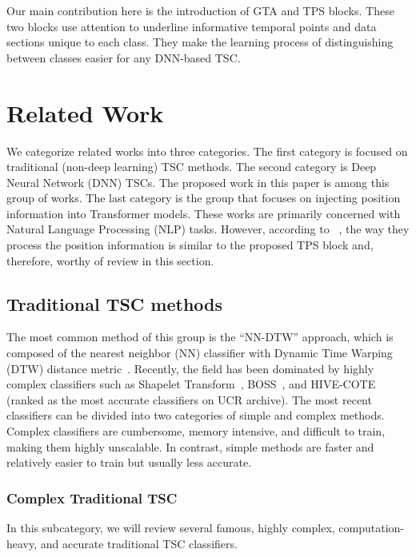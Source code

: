 \documentclass[journal]{IEEEtran}
\begin{document}
Our main contribution here is the introduction of GTA and TPS blocks. These two blocks use attention to underline informative temporal points and data sections unique to each class. They make the learning process of distinguishing between classes easier for any DNN-based TSC.

\section{Related Work}
We categorize related works into three categories. The first category is focused on traditional (non-deep learning) TSC methods. The second category is Deep Neural Network (DNN) TSCs. The proposed work in this paper is among this group of works. The last category is the group that focuses on injecting position information into Transformer models. These works are primarily concerned with Natural Language Processing (NLP) tasks. However, according to ~\cite{dufter2022position}, the way they process the position information is similar to the proposed TPS block and, therefore, worthy of review in this section.


\subsection{Traditional TSC methods}
The most common method of this group is the “NN-DTW” approach, which is composed of the nearest neighbor (NN) classifier with Dynamic Time Warping (DTW) distance metric~\cite{lines2015time}. Recently, the field has been dominated by highly complex classifiers such as Shapelet Transform~\cite{bagnall2017great}, BOSS~\cite{bagnall2017great}, and HIVE-COTE~\cite{lines2018time,2021hive} (ranked as the most accurate classifiers on UCR archive\cite{bagnall2017great,2021hive}). The most recent classifiers can be divided into two categories of simple and complex methods. Complex classifiers are cumbersome, memory intensive, and difficult to train, making them highly unscalable. In contrast, simple methods are faster and relatively easier to train but usually less accurate. 
\subsubsection{\textbf{Complex Traditional TSC}}
In this subcategory, we will review several famous, highly complex, computation-heavy, and accurate traditional TSC classifiers.
\end{document}

